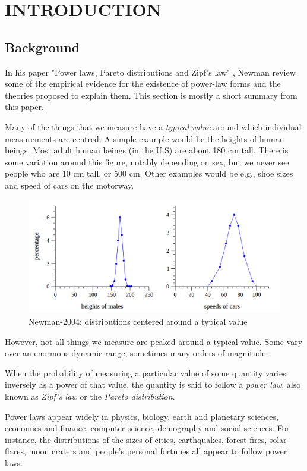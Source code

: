 \documentclass[a4paper, 12pt]{report}
\begin{document}
\newpage
{}
\chapter{INTRODUCTION}

\section{Background}
In his paper "Power laws, Pareto distributions and Zipf’s law" \cite{newman}, Newman review some of the empirical evidence for the existence of power-law forms and the theories proposed to explain them. This section is mostly a short summary from this paper.

Many of the things that we measure have a \textit{typical value} around which individual measurements are centred. A simple example would be the heights of human beings. Most adult human beings (in the U.S) are about 180 cm tall. There is some variation around this figure, notably depending on sex, but we never see people who are 10 cm tall, or 500 cm. Other examples would be e.g., shoe sizes and speed of cars on the motorway.

\begin{figure}[!htb]
\centering
\includegraphics[width=0.7\linewidth]{./heights-of-males}
\caption{Newman-2004: distributions centered around a typical value}
\label{fig:heights-of-males}
\end{figure}

However, not all things we measure are peaked around a typical value. Some vary over an enormous dynamic range, sometimes many orders of magnitude. 

When the probability of measuring a particular value of some quantity varies inversely as
a power of that value, the quantity is said to follow a \textit{power law}, also known as \textit{Zipf’s law} or the \textit{Pareto distribution}. 

\newpage
Power laws appear widely in physics, biology, earth and planetary sciences, economics and finance, computer science, demography and social sciences. For instance, the distributions of the sizes of cities, earthquakes, forest fires, solar flares, moon craters and people’s personal fortunes all appear to follow power laws.
\end{document}
